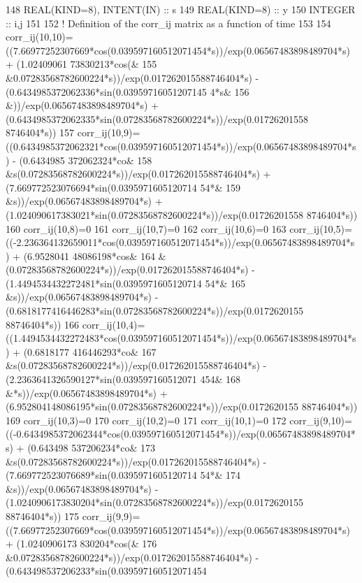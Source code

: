 \begin{DoxyCode}
148     \textcolor{keywordtype}{REAL(KIND=8)}, \textcolor{keywordtype}{INTENT(IN)} :: s
149     \textcolor{keywordtype}{REAL(KIND=8)} :: y
150     \textcolor{keywordtype}{INTEGER} :: i,j
151 
152     \textcolor{comment}{! Definition of the corr\_ij matrix as a function of time}
153 
154     corr\_ij(10,10)=((7.66977252307669*cos(0.039597160512071454*s))/exp(0.06567483898489704*s) + (1.02409061
      73830213*cos(&
155          &0.07283568782600224*s))/exp(0.017262015588746404*s) - (0.6434985372062336*sin(0.03959716051207145
      4*s&
156          &))/exp(0.06567483898489704*s) + (0.6434985372062335*sin(0.07283568782600224*s))/exp(0.01726201558
      8746404*s)) 
157     corr\_ij(10,9)=((0.6434985372062321*cos(0.039597160512071454*s))/exp(0.06567483898489704*s) - (0.6434985
      372062324*co&
158          &s(0.07283568782600224*s))/exp(0.017262015588746404*s) + (7.669772523076694*sin(0.0395971605120714
      54*&
159          &s))/exp(0.06567483898489704*s) + (1.024090617383021*sin(0.07283568782600224*s))/exp(0.01726201558
      8746404*s)) 
160     corr\_ij(10,8)=0
161     corr\_ij(10,7)=0
162     corr\_ij(10,6)=0
163     corr\_ij(10,5)=((-2.236364132659011*cos(0.039597160512071454*s))/exp(0.06567483898489704*s) + (6.9528041
      48086198*cos&
164          &(0.07283568782600224*s))/exp(0.017262015588746404*s) - (1.4494534432272481*sin(0.0395971605120714
      54*&
165          &s))/exp(0.06567483898489704*s) - (0.6818177416446283*sin(0.07283568782600224*s))/exp(0.0172620155
      88746404*s)) 
166     corr\_ij(10,4)=((1.4494534432272483*cos(0.039597160512071454*s))/exp(0.06567483898489704*s) + (0.6818177
      416446293*co&
167          &s(0.07283568782600224*s))/exp(0.017262015588746404*s) - (2.2363641326590127*sin(0.039597160512071
      454&
168          &*s))/exp(0.06567483898489704*s) + (6.952804148086195*sin(0.07283568782600224*s))/exp(0.0172620155
      88746404*s)) 
169     corr\_ij(10,3)=0
170     corr\_ij(10,2)=0
171     corr\_ij(10,1)=0
172     corr\_ij(9,10)=((-0.6434985372062344*cos(0.039597160512071454*s))/exp(0.06567483898489704*s) + (0.643498
      537206234*co&
173          &s(0.07283568782600224*s))/exp(0.017262015588746404*s) - (7.669772523076689*sin(0.0395971605120714
      54*&
174          &s))/exp(0.06567483898489704*s) - (1.0240906173830204*sin(0.07283568782600224*s))/exp(0.0172620155
      88746404*s)) 
175     corr\_ij(9,9)=((7.66977252307669*cos(0.039597160512071454*s))/exp(0.06567483898489704*s) + (1.0240906173
      830204*cos(&
176          &0.07283568782600224*s))/exp(0.017262015588746404*s) - (0.643498537206233*sin(0.039597160512071454

\end{DoxyCode}
